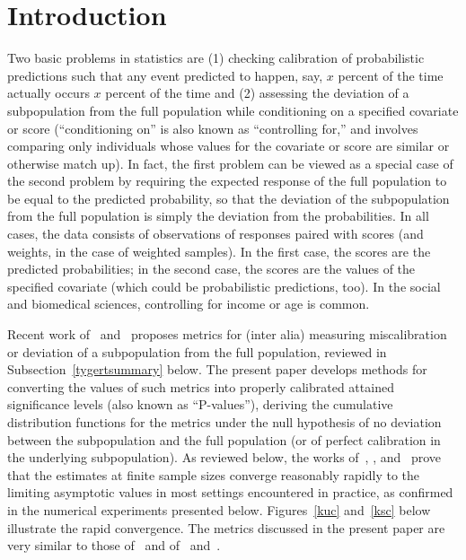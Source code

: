 \documentclass[12pt]{article}
\begin{document}
\newpage
{}



\section{Introduction}

Two basic problems in statistics are (1) checking calibration
of probabilistic predictions such that any event predicted
to happen, say, $x$ percent of the time actually occurs $x$ percent of the time
and (2) assessing the deviation of a subpopulation
from the full population while conditioning on a specified covariate or score
(``conditioning on'' is also known as ``controlling for,''
and involves comparing only individuals whose values for the covariate or score
are similar or otherwise match up).
In fact, the first problem can be viewed as a special case
of the second problem by requiring the expected response of the full population
to be equal to the predicted probability, so that the deviation
of the subpopulation from the full population is simply the deviation
from the probabilities. In all cases, the data consists of observations
of responses paired with scores (and weights, in the case of weighted samples).
In the first case, the scores are the predicted probabilities;
in the second case, the scores are the values of the specified covariate
(which could be probabilistic predictions, too).
In the social and biomedical sciences, controlling for income or age is common.

Recent work of~\citet{tygert_full} and~\citet{tygert_two} proposes metrics
for (inter alia) measuring miscalibration or deviation of a subpopulation
from the full population, reviewed in Subsection~\ref{tygertsummary} below.
The present paper develops methods for converting the values of such metrics
into properly calibrated attained significance levels
(also known as ``P-values''), deriving the cumulative distribution functions
for the metrics under the null hypothesis of no deviation between
the subpopulation and the full population (or of perfect calibration
in the underlying subpopulation). As reviewed below,
the works of~\citet{delgado}, \citet{diebolt}, and~\citet{stute}
prove that the estimates at finite sample sizes converge reasonably rapidly
to the limiting asymptotic values in most settings encountered in practice,
as confirmed in the numerical experiments presented below.
Figures~\ref{kuc} and~\ref{ksc} below illustrate the rapid convergence.
The metrics discussed in the present paper are very similar
to those of~\citet{kuiper} and of~\citet{kolmogorov} and~\citet{smirnov}.
\end{document}
